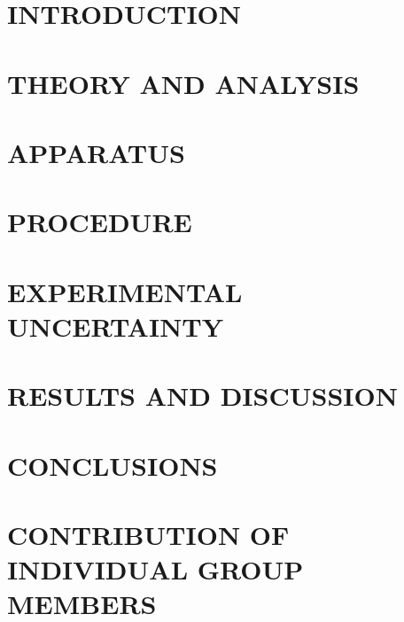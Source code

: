 \documentclass[12pt]{article}
\begin{document}


\newpage

\section{INTRODUCTION} \label{sec:1}

\clearpage
\section{THEORY AND ANALYSIS} \label{sec:2}

\clearpage
\section{APPARATUS} \label{sec:3}

\clearpage
\section{PROCEDURE} \label{sec:4}

\clearpage
\section{EXPERIMENTAL UNCERTAINTY} \label{sec:5}

\clearpage
\section{RESULTS AND DISCUSSION} \label{sec:6}

\clearpage
\section{CONCLUSIONS} \label{sec:7}

\clearpage
\label{sec:8}



\section*{CONTRIBUTION OF INDIVIDUAL GROUP MEMBERS} \label{sec:9}

\end{document}
